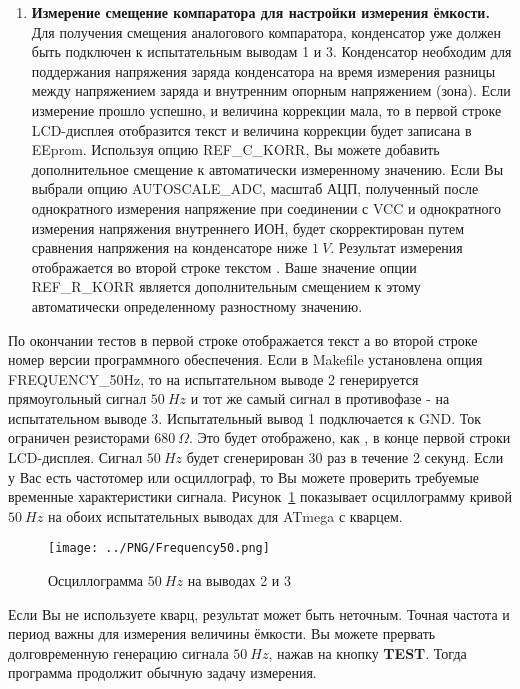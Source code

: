 \begin{enumerate}
\item \textbf{ Измерение смещение компаратора для настройки измерения ёмкости.}
Для получения смещения аналогового компаратора, конденсатор уже должен быть подключен к испытательным выводам 
1 и 3. Конденсатор необходим для поддержания напряжения заряда конденсатора на время измерения разницы между 
напряжением заряда и внутренним опорным напряжением (зона). Если измерение прошло успешно, и величина коррекции 
мала, то в первой строке LCD-дисплея отобразится текст  и величина коррекции будет записана в  EEprom. 
Используя опцию REF\_C\_KORR, Вы можете добавить дополнительное смещение к автоматически измеренному значению. 
Если Вы выбрали опцию AUTOSCALE\_ADC, масштаб АЦП, полученный после однократного измерения напряжение при 
соединении с VCC и однократного измерения напряжения внутреннего ИОН, будет скорректирован путем сравнения 
напряжения на конденсаторе ниже \(1~V\). Результат измерения отображается во второй строке текстом . 
Ваше значение опции REF\_R\_KORR является дополнительным смещением к этому автоматически определенному разностному 
значению.

\end{enumerate}

По окончании тестов в первой строке отображается текст  а во второй строке номер версии программного 
обеспечения. 
Если в Makefile установлена опция  FREQUENCY\_50Hz, то на испытательном выводе 2 генерируется прямоугольный 
сигнал \(50~Hz\) и тот же самый сигнал в противофазе - на испытательном выводе 3. Испытательный вывод 1 
подключается к GND. Ток ограничен резисторами \(680~\Omega\).
Это будет отображено, как  , в конце первой строки  LCD-дисплея. Сигнал \(50~Hz\) будет сгенерирован 30 раз 
в течение 2 секунд. Если у Вас есть частотомер или осциллограф, то Вы можете проверить требуемые временные 
характеристики сигнала.
Рисунок~\ref{fig:Frequency50} показывает осциллограмму кривой \(50~Hz\) на обоих испытательных выводах для ATmega 
с кварцем.

\begin{figure}[H]
\centering
\texttt{[image: ../PNG/Frequency50.png]}
\caption{Осциллограмма \(50~Hz\) на выводах 2 и 3}
\label{fig:Frequency50}
\end{figure}

Если Вы не используете кварц, результат может быть неточным. Точная частота и период важны для измерения величины 
ёмкости. Вы можете прервать долговременную генерацию сигнала \(50~Hz\), нажав на кнопку \textbf{ TEST}. Тогда программа 
продолжит обычную задачу измерения.

